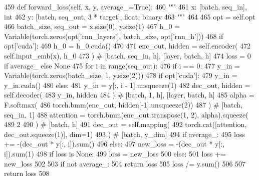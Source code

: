 \begin{DoxyCode}
459     \textcolor{keyword}{def }forward\_loss(self, x, y, average\_=True):
460         \textcolor{stringliteral}{"""}
461 \textcolor{stringliteral}{        x: [batch, seq\_in], int}
462 \textcolor{stringliteral}{        y: [batch, seq\_out, 3 * target], float, binary}
463 \textcolor{stringliteral}{        """}
464 
465         opt = self.opt
466         batch\_size, seq\_out = x.size(0), y.size(1)
467         h\_0 = Variable(torch.zeros(opt[\textcolor{stringliteral}{'rnn\_layers'}], batch\_size, opt[\textcolor{stringliteral}{'rnn\_h'}]))
468         \textcolor{keywordflow}{if} opt[\textcolor{stringliteral}{'cuda'}]:
469             h\_0 = h\_0.cuda()
470 
471         enc\_out, hidden = self.encoder(
472             self.input\_emb(x), h\_0
473         )  \textcolor{comment}{# [batch, seq\_in, h], [layer, batch, h]}
474         loss = 0 \textcolor{keywordflow}{if} average\_ \textcolor{keywordflow}{else} \textcolor{keywordtype}{None}
475         \textcolor{keywordflow}{for} i \textcolor{keywordflow}{in} range(seq\_out):
476             \textcolor{keywordflow}{if} i == 0:
477                 y\_in = Variable(torch.zeros(batch\_size, 1, y.size(2)))
478                 \textcolor{keywordflow}{if} opt[\textcolor{stringliteral}{'cuda'}]:
479                     y\_in = y\_in.cuda()
480             \textcolor{keywordflow}{else}:
481                 y\_in = y[:, i - 1].unsqueeze(1)
482             dec\_out, hidden = self.decoder(
483                 y\_in, hidden
484             )  \textcolor{comment}{# [batch, 1, h], [layer, batch, h]}
485             alpha = F.softmax(
486                 torch.bmm(enc\_out, hidden[-1].unsqueeze(2))
487             )  \textcolor{comment}{# [batch, seq\_in, 1]}
488             attention = torch.bmm(enc\_out.transpose(1, 2), alpha).squeeze(
489                 2
490             )  \textcolor{comment}{# [batch, h]}
491             dec\_out = self.mapping(
492                 torch.cat([attention, dec\_out.squeeze(1)], dim=1)
493             )  \textcolor{comment}{# [batch, y\_dim]}
494             \textcolor{keywordflow}{if} average\_:
495                 loss += -(dec\_out * y[:, i]).sum()
496             \textcolor{keywordflow}{else}:
497                 new\_loss = -(dec\_out * y[:, i]).sum(1)
498                 \textcolor{keywordflow}{if} loss \textcolor{keywordflow}{is} \textcolor{keywordtype}{None}:
499                     loss = new\_loss
500                 \textcolor{keywordflow}{else}:
501                     loss += new\_loss
502 
503         \textcolor{keywordflow}{if} \textcolor{keywordflow}{not} average\_:
504             \textcolor{keywordflow}{return} loss
505         loss /= y.sum()
506 
507         \textcolor{keywordflow}{return} loss
508 
\end{DoxyCode}
